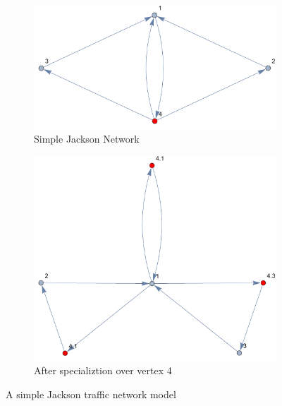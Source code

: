 \documentclass[12pt]{thesis}
\begin{document}
\begin{figure}
    \centering
    \begin{subfigure}[b]{0.45\textwidth}
        \centering
        \includegraphics[width=\textwidth]{images/jackson_graph_1.pdf}
        \caption{Simple Jackson Network}
        \label{fig:jackson_graph_1}
    \end{subfigure}
    \hfill
    \begin{subfigure}[b]{0.45\textwidth}
        \centering
        \includegraphics[width=\textwidth]{images/jackson_graph_2.pdf}
        \caption{After specializtion over vertex 4}
        \label{fig:jackson_graph_2}
    \end{subfigure}
    \hfill
       \caption{A simple Jackson traffic network model}
       \label{fig:jackson_graph}
\end{figure}
\end{document}
